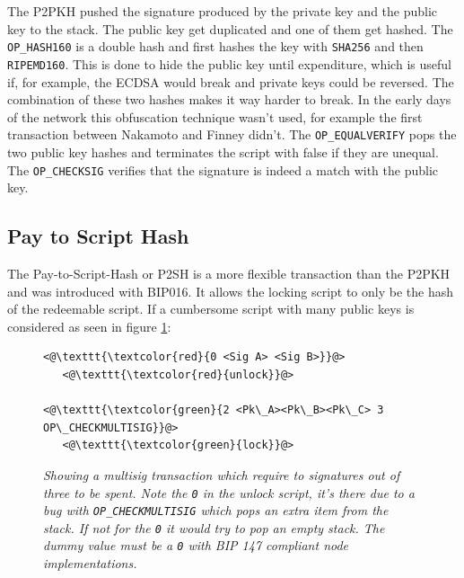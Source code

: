 The P2PKH pushed the signature produced by the private key and the public key to the stack. The public key get duplicated and one of them get hashed. The \texttt{OP\_HASH160} is a double hash and first hashes the key with \texttt{SHA256} and then \texttt{RIPEMD160}. This is done to hide the public key until expenditure, which is useful if, for example, the ECDSA would break and private keys could be reversed. The combination of these two hashes makes it way harder to break. In the early days of the network this obfuscation technique wasn't used, for example the first transaction between Nakamoto and Finney didn't\cite{nakamoto:finney:tx}.
The \texttt{OP\_EQUALVERIFY} pops the two public key hashes and terminates the script with false if they are unequal.
The \texttt{OP\_CHECKSIG} verifies that the signature is indeed a match with the public key. 

\subsection{Pay to Script Hash}

The Pay-to-Script-Hash or P2SH is a more flexible transaction than the P2PKH and was introduced with BIP016\cite{bip:0016:p2sh}. It allows the locking script to only be the hash of the redeemable script. If a cumbersome script with many public keys is considered as seen in figure \ref{fig:cumbersome:script}:

\begin{figure}
	
	\begin{lstlisting}
<@\texttt{\textcolor{red}{0 <Sig A> <Sig B>}}@>   
   <@\texttt{\textcolor{red}{unlock}}@>
	
<@\texttt{\textcolor{green}{2 <Pk\_A><Pk\_B><Pk\_C> 3 OP\_CHECKMULTISIG}}@>
   <@\texttt{\textcolor{green}{lock}}@>
	\end{lstlisting}
	
	\caption{\textit{ Showing a multisig transaction which require to signatures out of three to be spent. Note the \texttt{0} in the unlock script, it's there due to a bug with \texttt{OP\_CHECKMULTISIG} which pops an extra item from the stack. If not for the \texttt{0} it would try to pop an empty stack. The dummy value must be a \texttt{0} with BIP 147 compliant node implementations\cite{bip:0147:dummy:zero}.
	}}
	\label{fig:cumbersome:script}
\end{figure} 

